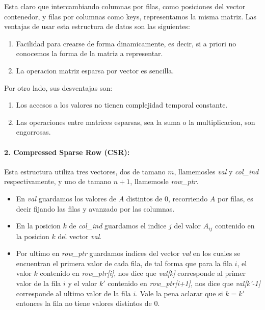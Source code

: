 \newline
Esta claro que intercambiando columnas por filas, como posiciones del vector contenedor, y filas por columnas como keys, representamos la misma matriz.
\newline
\newline
Las ventajas de usar esta estructura de datos son las siguientes:
\begin{enumerate}
  \item Facilidad para crearse de forma dinamicamente, es decir, si a priori no conocemos la forma de la matriz a representar.
  \item La operacion matriz esparsa por vector es sencilla.
\end{enumerate}
Por otro lado, sus desventajas son:
\begin{enumerate}
  \item Los accesos a los valores no tienen complejidad temporal constante.
  \item Las operaciones entre matrices esparsas, sea la suma o la multiplicacion, son engorrosas.
\end{enumerate}

\paragraph{2. Compressed Sparse Row (CSR):}

Esta estructura utiliza tres vectores, dos de tamano $m$, llamemosles \textit{val} y \textit{col_ind} respectivamente, y uno de tamano $n+1$, llamemosle \textit{row_ptr}.
\begin{itemize}
    \item En \textit{val} guardamos los valores de $A$ distintos de 0, recorriendo $A$ por filas, es decir fijando las filas y avanzado por las columnas.
    \item En la posicion $k$ de \textit{col_ind} guardamos el indice $j$ del valor $A_{ij}$ contenido en la posicion $k$ del vector \textit{val}.
    \item Por ultimo en \textit{row_ptr} guardamos indices del vector \textit{val} en los cuales se encuentran el primera valor de cada fila, de tal
     forma que para la fila $i$, el valor $k$ contenido en \textit{row_ptr[i]}, nos dice que \textit{val[k]} corresponde al primer valor de la fila
      $i$ y el valor $k'$ contenido en \textit{row_ptr[i+1]}, nos dice que \textit{val[k'-1]} corresponde al ultimo valor de la fila $i$.
      Vale la pena aclarar que si $k = k'$ entonces la fila no tiene valores distintos de 0.
\end{itemize}

